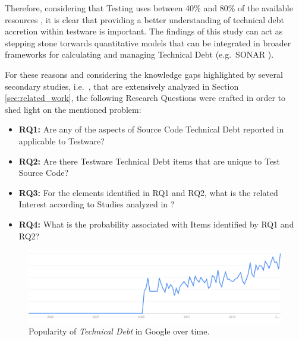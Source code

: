 Therefore, considering that Testing uses between 40\% and 80\% of the available resources \cite{exploratorying_testing_td}, it is clear that providing a better understanding of technical debt accretion within testware is important. The findings of this study can act as stepping stone torwards quantitative models that can be integrated in broader frameworks for calculating and managing Technical Debt (e.g.\ SONAR \cite{sonar_evaluate_td}).

For these reasons and considering the knowledge gaps highlighted by several secondary studies, i.e.\ \cite{mapping_study_td, exploration_of_td, exploration_of_td2}, that are extensively analyzed in Section \ref{sec:related_work}, the following Research Questions were crafted in order to shed light on the mentioned problem:

\begin{itemize}
    \itemsep0em 
    
    \item \textbf{RQ1:} Are any of the aspects of Source Code Technical Debt reported in \cite{mapping_study_td} applicable to Testware?
    
    \item \textbf{RQ2:} Are there Testware Technical Debt items that are unique to Test Source Code?
    
    \item \textbf{RQ3:} For the elements identified in RQ1 and RQ2, what is the related Interest according to Studies analyzed in \cite{mapping_study_td}?
    
    \item \textbf{RQ4:} What is the probability associated with Items identified by RQ1 and RQ2?
    
\end{itemize}


\begin{figure}[h]
    \centering
    \includegraphics[width=\textwidth]{figure/technicalDebt.pdf}
    \caption{Popularity of \textit{Technical Debt} in Google over time.}
    \label{fig:technical_debt_trend}
\end{figure}

